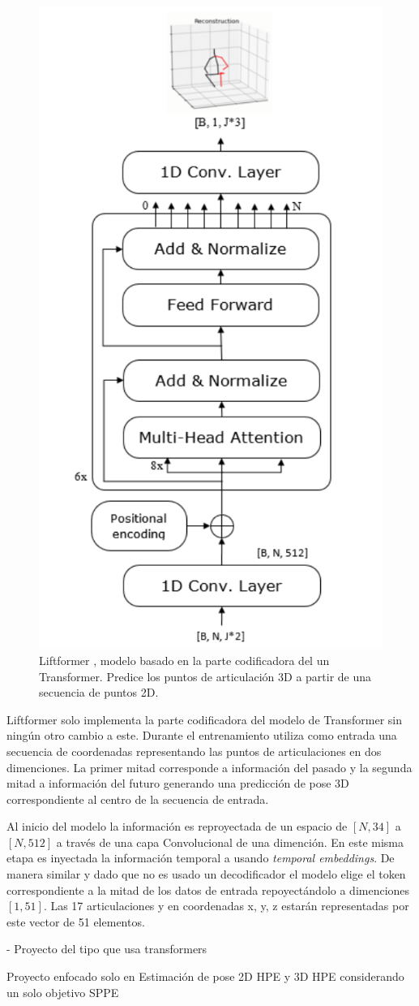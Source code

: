 \begin{figure}[!ht]
    \centering
    \includegraphics[width=.4\textwidth]{Chapters/3. Trans-HPE/img/poseTrans.png}
    \caption[Liftformer]{Liftformer
    \cite{DBLP:journals/corr/abs-2009-00348}, modelo basado en la parte codificadora del un Transformer.
    Predice los puntos de articulación 3D a partir de una secuencia de puntos 2D.}
\label{fig:Liftformerfig}
\end{figure}

Liftformer solo implementa la parte codificadora del modelo de
Transformer sin ningún otro cambio a este. Durante el entrenamiento utiliza como entrada una secuencia
de coordenadas representando las puntos de articulaciones en dos dimenciones. La primer mitad corresponde
a información del pasado y la segunda mitad a información del futuro generando una predicción de pose
3D correspondiente al centro de la secuencia de entrada.

Al inicio del modelo la información es reproyectada de un espacio de $[N, 34]$ a $[N, 512]$ a través
de una capa Convolucional de una dimención. En este misma etapa es inyectada la información temporal
a usando \textit{temporal embeddings}. De manera similar y dado que no es usado un decodificador
el modelo elige el token correspondiente a la mitad de los datos de entrada repoyectándolo a dimenciones
$[1, 51]$. Las 17 articulaciones y en coordenadas x, y, z estarán representadas por este vector de 51
elementos.


- Proyecto del tipo que usa transformers

Proyecto enfocado solo en Estimación de pose 2D HPE y 3D HPE considerando un solo objetivo SPPE

